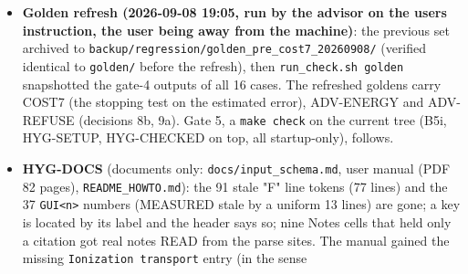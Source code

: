 \documentclass[english,a4paper]{my_memo}
\begin{document}
\begin{itemize}
  and HYG-CHECKED landed during the matrix; they touch startup checks and
  a file-open order only, and were verified on the advisor build with the
  full \texttt{grid\_and\_gates} suite, 102/0): shared build remade, \textbf{\texttt{make\ test}
  all suites green}; \texttt{make\ check} FAIL against 1e-3 as expected. \textbf{The
  marching files are unchanged from gate 3 to the digit}: \texttt{Hydro\_ioniz.txt}
  and \texttt{Ion\_species.txt} carry exactly COST7\textquotesingle s movement on every case
  (identical max-rel values in both logs, the three \texttt{hp\_*} cases still
  identical), so B5g, B5h, the three ADV items, B5i and the hygiene items
  moved nothing on the marching path, and log10 Mdot is unchanged on all
  14 cases. The \texttt{\_adv} files move by design: \texttt{Hydro\_ioniz\_adv.txt} now has
  eight columns (\texttt{adv\_status}, the harness reports SHAPE 8 vs 7), and
  \texttt{Ion\_species\_adv.txt} moves by 0.05 (\texttt{wasp\_full\_newton}, He I at the
  outer edge) to order one (the molecular cases and the \texttt{hp\_*} cases,
  whose refused base cells now carry the equilibrium densities; the
  relative measure is element-wise, so a species the old correction had
  moved off its equilibrium value reads 1). \textbf{Goldens to be refreshed by
  the user, once, for COST7 + ADV-ENERGY + ADV-REFUSE together} (archive
  first), then \texttt{make\ check} re-run by the advisor.
\item
  \textbf{Golden refresh (2026-09-08 19:05, run by the advisor on the user\textquotesingle s
  instruction, the user being away from the machine)}: the previous set
  archived to \texttt{backup/regression/golden\_pre\_cost7\_20260908/} (verified
  identical to \texttt{golden/} before the refresh), then \texttt{run\_check.sh\ golden}
  snapshotted the gate-4 outputs of all 16 cases. The refreshed goldens
  carry COST7 (the stopping test on the estimated error), ADV-ENERGY and
  ADV-REFUSE (decisions 8b, 9a). Gate 5, a \texttt{make\ check} on the current
  tree (B5i, HYG-SETUP, HYG-CHECKED on top, all startup-only), follows.
\item
  \textbf{HYG-DOCS} (documents only: \texttt{docs/input\_schema.md}, user manual (PDF 82
  pages), \texttt{README\_HOWTO.md}): the 91 stale "F" line tokens (77 lines)
  and the 37 \texttt{GUI\textless{}n\textgreater{}} numbers (MEASURED stale by a uniform 13 lines) are
  gone; a key is located by its label and the header says so; nine Notes
  cells that held only a citation got real notes READ from the parse sites.
  The manual gained the missing \texttt{Ionization\ transport} entry (in the sense

\end{itemize}
\end{document}
